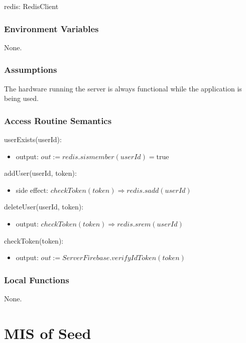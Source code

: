 \documentclass[12pt, titlepage]{article}
\begin{document}
redis: RedisClient

\subsubsection{Environment Variables}

None.

\subsubsection{Assumptions}

The hardware running the server is always functional while the application is being used.

\subsubsection{Access Routine Semantics}

\noindent userExists(userId):
\begin{itemize}
\item output: $out := redis.sismember(userId) = \text{true}$
\end{itemize}

\noindent addUser(userId, token):
\begin{itemize}
\item side effect: $checkToken(token) \Rightarrow redis.sadd(userId)$
\end{itemize}

\noindent deleteUser(userId, token):
\begin{itemize}
\item output: $checkToken(token) \Rightarrow redis.srem(userId)$
\end{itemize}

\noindent checkToken(token):
\begin{itemize}
\item output: $out := ServerFirebase.verifyIdToken(token)$
\end{itemize}

\subsubsection{Local Functions}

None.
  
\medskip
\newpage

\section{MIS of Seed} \label{Seed} 
\end{document}
